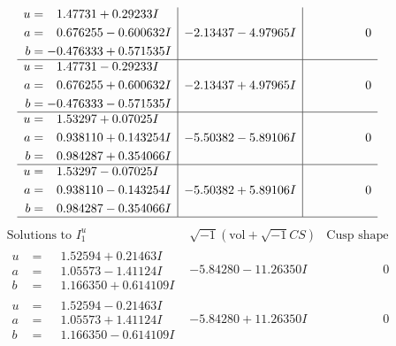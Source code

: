 \documentclass[1p]{elsarticle_modified}
\theoremstyle{definition}
\newcommand{\I}{\sqrt{-1}}
\begin{document}
$$\begin{array}{c|c|c}
\begin{aligned}
u &= \phantom{-}1.47731 + 0.29233 I \\
a &= \phantom{-}0.676255 - 0.600632 I \\
b &= -0.476333 + 0.571535 I\end{aligned}
 & -2.13437 - 4.97965 I & \phantom{-0.000000 } 0 \\ \hline\begin{aligned}
u &= \phantom{-}1.47731 - 0.29233 I \\
a &= \phantom{-}0.676255 + 0.600632 I \\
b &= -0.476333 - 0.571535 I\end{aligned}
 & -2.13437 + 4.97965 I & \phantom{-0.000000 } 0 \\ \hline\begin{aligned}
u &= \phantom{-}1.53297 + 0.07025 I \\
a &= \phantom{-}0.938110 + 0.143254 I \\
b &= \phantom{-}0.984287 + 0.354066 I\end{aligned}
 & -5.50382 - 5.89106 I & \phantom{-0.000000 } 0 \\ \hline\begin{aligned}
u &= \phantom{-}1.53297 - 0.07025 I \\
a &= \phantom{-}0.938110 - 0.143254 I \\
b &= \phantom{-}0.984287 - 0.354066 I\end{aligned}
 & -5.50382 + 5.89106 I & \phantom{-0.000000 } 0\\
 \hline 
 \end{array}$$\newpage$$\begin{array}{c|c|c}  
\text{Solutions to }I^u_{1}& \I (\text{vol} + \sqrt{-1}CS) & \text{Cusp shape}\\
 \hline 
\begin{aligned}
u &= \phantom{-}1.52594 + 0.21463 I \\
a &= \phantom{-}1.05573 - 1.41124 I \\
b &= \phantom{-}1.166350 + 0.614109 I\end{aligned}
 & -5.84280 - 11.26350 I & \phantom{-0.000000 } 0 \\ \hline\begin{aligned}
u &= \phantom{-}1.52594 - 0.21463 I \\
a &= \phantom{-}1.05573 + 1.41124 I \\
b &= \phantom{-}1.166350 - 0.614109 I\end{aligned}
 & -5.84280 + 11.26350 I & \phantom{-0.000000 } 0 \\ \hline\begin{aligned}

\end{aligned}
\end{array}$$
\end{document}
